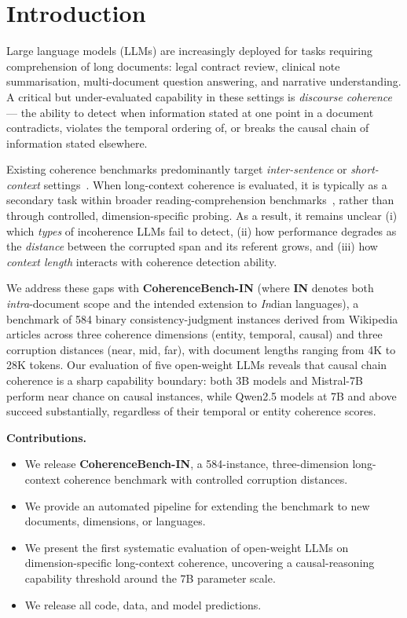 \documentclass{llncs}
\begin{document}
\section{Introduction}
Large language models (LLMs) are increasingly deployed for tasks requiring
comprehension of long documents: legal contract review, clinical note summarisation,
multi-document question answering, and narrative understanding.
A critical but under-evaluated capability in these settings is \emph{discourse coherence}---
the ability to detect when information stated at one point in a document
contradicts, violates the temporal ordering of, or breaks the causal chain of
information stated elsewhere.

Existing coherence benchmarks predominantly target \emph{inter-sentence} or
\emph{short-context} settings~\cite{cervone2018,logeswaran2018,tevet2021}.
When long-context coherence is evaluated, it is typically as a secondary task
within broader reading-comprehension benchmarks~\cite{dasigi2021,ho2020},
rather than through controlled, dimension-specific probing.
As a result, it remains unclear (i) which \emph{types} of incoherence LLMs fail to
detect, (ii) how performance degrades as the \emph{distance} between the
corrupted span and its referent grows, and
(iii) how \emph{context length} interacts with coherence detection ability.

We address these gaps with \textbf{CoherenceBench-IN} (where \textbf{IN} denotes both \emph{intra}-document scope and the intended extension to \emph{In}dian languages),
a benchmark of 584 binary consistency-judgment instances
derived from Wikipedia articles across three coherence dimensions
(entity, temporal, causal) and three corruption distances (near, mid, far),
with document lengths ranging from 4K to 28K tokens.
Our evaluation of five open-weight LLMs reveals that
causal chain coherence is a sharp capability boundary:
both 3B models and Mistral-7B perform near chance on causal instances,
while Qwen2.5 models at 7B and above succeed substantially,
regardless of their temporal or entity coherence scores.

\noindent\textbf{Contributions.}
\begin{itemize}
    \item We release \textbf{CoherenceBench-IN}, a 584-instance, three-dimension
          long-context coherence benchmark with controlled corruption distances.
    \item We provide an automated pipeline for extending the benchmark to new
          documents, dimensions, or languages.
    \item We present the first systematic evaluation of open-weight LLMs on
          dimension-specific long-context coherence, uncovering a causal-reasoning
          capability threshold around the 7B parameter scale.
    \item We release all code, data, and model predictions.
\end{itemize}
\end{document}
